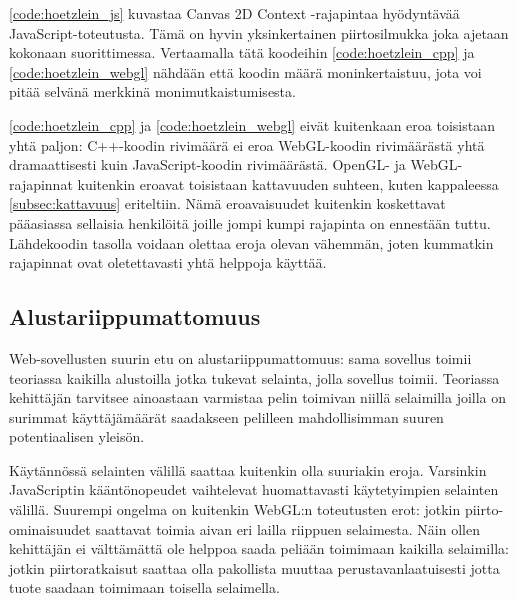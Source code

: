 \autoref{code:hoetzlein_js} kuvastaa Canvas 2D Context -rajapintaa hyödyntävää JavaScript-toteutusta. Tämä on hyvin yksinkertainen piirtosilmukka joka ajetaan kokonaan suorittimessa. Vertaamalla tätä koodeihin \ref{code:hoetzlein_cpp} ja \ref{code:hoetzlein_webgl} nähdään että koodin määrä moninkertaistuu, jota voi pitää selvänä merkkinä monimutkaistumisesta.

\autoref{code:hoetzlein_cpp} ja \autoref{code:hoetzlein_webgl} eivät kuitenkaan eroa toisistaan yhtä paljon: C++-koodin rivimäärä ei eroa WebGL-koodin rivimäärästä yhtä dramaattisesti kuin JavaScript-koodin rivimäärästä. OpenGL- ja WebGL-rajapinnat kuitenkin eroavat toisistaan kattavuuden suhteen, kuten kappaleessa \ref{subsec:kattavuus} eriteltiin. Nämä eroavaisuudet kuitenkin koskettavat pääasiassa sellaisia henkilöitä joille jompi kumpi rajapinta on ennestään tuttu. Lähdekoodin tasolla voidaan olettaa eroja olevan vähemmän, joten kummatkin rajapinnat ovat oletettavasti yhtä helppoja käyttää. 





\subsection{Alustariippumattomuus}

Web-sovellusten suurin etu on alustariippumattomuus: sama sovellus toimii teoriassa kaikilla alustoilla jotka tukevat selainta, jolla sovellus toimii. Teoriassa kehittäjän tarvitsee ainoastaan varmistaa pelin toimivan niillä selaimilla joilla on surimmat käyttäjämäärät saadakseen pelilleen mahdollisimman suuren potentiaalisen yleisön.

Käytännössä selainten välillä saattaa kuitenkin olla suuriakin eroja. Varsinkin JavaScriptin kääntönopeudet vaihtelevat huomattavasti käytetyimpien selainten välillä\cite{hoetzlein}. Suurempi ongelma on kuitenkin WebGL:n toteutusten erot: jotkin piirto-ominaisuudet saattavat toimia aivan eri lailla riippuen selaimesta\cite{voutilainen}. Näin ollen kehittäjän ei välttämättä ole helppoa saada peliään toimimaan kaikilla selaimilla: jotkin piirtoratkaisut saattaa olla pakollista muuttaa perustavanlaatuisesti jotta tuote saadaan toimimaan toisella selaimella.

